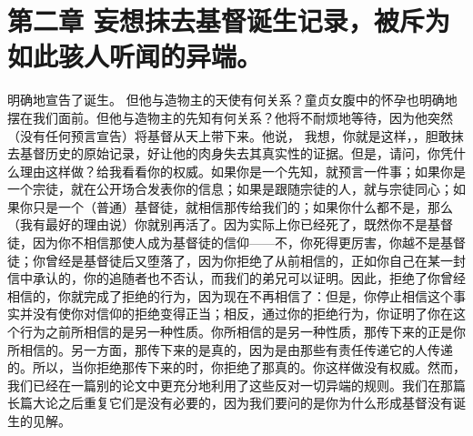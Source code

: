 
\section{第二章 妄想抹去基督诞生记录，被斥为如此骇人听闻的异端。}

明确地宣告了诞生。 但他与造物主的天使有何关系？童贞女腹中的怀孕也明确地摆在我们面前。但他与造物主的先知有何关系？他将不耐烦地等待，因为他突然（没有任何预言宣告）将基督从天上带下来。他说， 我想，你就是这样，，胆敢抹去基督历史的原始记录，好让他的肉身失去其真实性的证据。但是，请问，你凭什么理由这样做？给我看看你的权威。如果你是一个先知，就预言一件事；如果你是一个宗徒，就在公开场合发表你的信息；如果是跟随宗徒的人，就与宗徒同心；如果你只是一个（普通）基督徒，就相信那传给我们的；如果你什么都不是，那么（我有最好的理由说）你就别再活了。因为实际上你已经死了，既然你不是基督徒，因为你不相信那使人成为基督徒的信仰——不，你死得更厉害，你越不是基督徒；你曾经是基督徒后又堕落了，因为你拒绝了从前相信的，正如你自己在某一封信中承认的，你的追随者也不否认，而我们的弟兄可以证明。因此，拒绝了你曾经相信的，你就完成了拒绝的行为，因为现在不再相信了：但是，你停止相信这个事实并没有使你对信仰的拒绝变得正当；相反，通过你的拒绝行为，你证明了你在这个行为之前所相信的是另一种性质。你所相信的是另一种性质，那传下来的正是你所相信的。另一方面，那传下来的是真的，因为是由那些有责任传递它的人传递的。所以，当你拒绝那传下来的时，你拒绝了那真的。你这样做没有权威。然而，我们已经在一篇别的论文中更充分地利用了这些反对一切异端的规则。我们在那篇长篇大论之后重复它们是没有必要的，因为我们要问的是你为什么形成基督没有诞生的见解。\par


